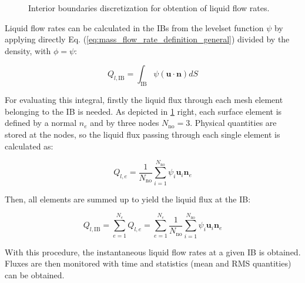 \begin{figure}[ht]
     \centering
     \caption{Interior boundaries discretization for obtention of liquid flow rates.}
      \label{fig:jicf_IBs_sketch_calculation}
\end{figure}

Liquid flow rates can be calculated in the IBs from the levelset function $\psi$ by applying directly Eq. (\ref{eq:mass_flow_rate_definition_general}) divided by the density, with $\phi = \psi$:

\begin{equation}
\label{eq:Q_lIB_general_definition}
Q_{l,\mathrm{IB}} = \int_{\mathrm{IB}} \psi \left( \textbf{u} \cdot \textbf{n} \right) dS
\end{equation}


For evaluating this integral, firstly the liquid flux through each mesh element belonging to the IB is needed. As depicted in \ref{fig:jicf_IBs_sketch_calculation} right, each surface element is defined by a normal $n_e$ and by three nodes $N_\mathrm{no} = 3$. Physical quantities are stored at the nodes, so the liquid flux passing through each single element is calculated as:

\begin{equation}
Q_{l,e} = \frac{1}{N_\mathrm{no}} \sum_{i=1}^{N_\mathrm{no}} \psi_i \textbf{u}_i \textbf{n}_e
\end{equation}

Then, all elements are summed up to yield the liquid flux at the IB:

\begin{equation}
\label{eq:Q_lIB_definition_with_Ne_and_No}
Q_{l,\mathrm{IB}} = \sum_{e=1}^{N_e} Q_{l,e} = \sum_{e=1}^{N_e} \frac{1}{N_\mathrm{no}} \sum_{i=1}^{N_\mathrm{no}} \psi_i \textbf{u}_i \textbf{n}_e
\end{equation}

With this procedure, the instantaneous liquid flow rates at a given IB is obtained. Fluxes are then monitored with time and statistics (mean and RMS quantities) can be obtained. \\






